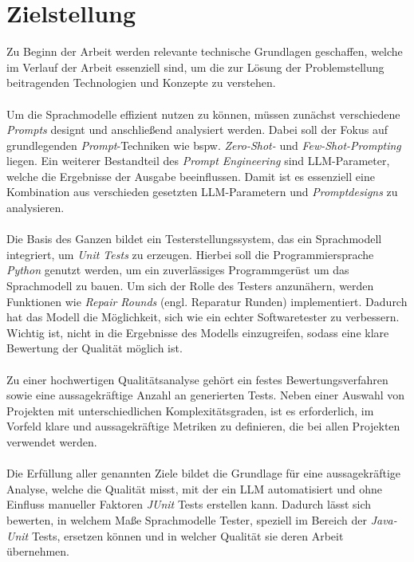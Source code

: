 \section{Zielstellung}\label{sec:goal}
Zu Beginn der Arbeit werden relevante technische Grundlagen geschaffen, welche im Verlauf der Arbeit essenziell sind, um die zur Lösung der Problemstellung beitragenden Technologien und Konzepte zu verstehen.\\\\ Um die Sprachmodelle effizient nutzen zu können, müssen zunächst verschiedene \textit{Prompts} designt und anschließend analysiert werden. Dabei soll der Fokus auf grundlegenden \textit{Prompt}-Techniken wie bspw. \textit{Zero-Shot-} und \textit{Few-Shot-Prompting} liegen. Ein weiterer Bestandteil des \textit{Prompt Engineering} sind LLM-Parameter, welche die Ergebnisse der Ausgabe beeinflussen. Damit ist es essenziell eine Kombination aus verschieden gesetzten LLM-Parametern und \textit{Promptdesigns} zu analysieren.\\\\ Die Basis des Ganzen bildet ein Testerstellungssystem, das ein Sprachmodell integriert, um \textit{Unit Tests} zu erzeugen. Hierbei soll die Programmiersprache \textit{Python} genutzt werden, um ein zuverlässiges Programmgerüst um das Sprachmodell zu bauen. 
Um sich der Rolle des Testers anzunähern, werden Funktionen wie \textit{Repair Rounds} (engl. Reparatur Runden) implementiert. Dadurch hat das Modell die Möglichkeit, sich wie ein echter Softwaretester zu verbessern. Wichtig ist, nicht in die Ergebnisse des Modells einzugreifen, sodass eine klare Bewertung der Qualität möglich ist.\\\\ Zu einer hochwertigen Qualitätsanalyse gehört ein festes Bewertungsverfahren sowie eine aussagekräftige Anzahl an generierten Tests. Neben einer Auswahl von Projekten mit unterschiedlichen Komplexitätsgraden, ist es erforderlich, im Vorfeld klare und aussagekräftige Metriken zu definieren, die bei allen Projekten verwendet werden.\\\\ Die Erfüllung aller genannten Ziele bildet die Grundlage für eine aussagekräftige Analyse, welche die Qualität misst, mit der ein LLM automatisiert und ohne Einfluss manueller Faktoren \textit{JUnit} Tests erstellen kann. Dadurch lässt sich bewerten, in welchem Maße Sprachmodelle Tester, speziell im Bereich der \textit{Java-Unit} Tests, ersetzen können und in welcher Qualität sie deren Arbeit übernehmen.